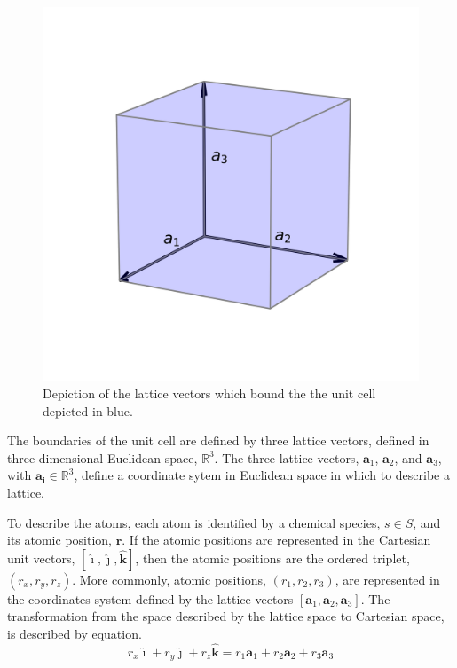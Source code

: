 \begin{figure}[ht]
	\centering
  \includegraphics{chapter3/unit_cell}
  \caption{Depiction of the lattice vectors which bound the the unit cell depicted in blue.}
  \label{fig:unit_cell}
\end{figure}

The boundaries of the unit cell are defined by three lattice vectors, defined in three dimensional Euclidean space, $\mathbb{R}^3$.
The three lattice vectors, $\bm{a}_1$, $\bm{a}_2$, and $\bm{a}_3$, with $\bm{a_i}\in\mathbb{R}^3$, define a coordinate sytem in Euclidean space in which to describe a lattice.

To describe the atoms, each atom is identified by a chemical species, $s\in S$, and its atomic position, $\bm{r}$.
If the atomic positions are represented in the Cartesian unit vectors, $[\hat{\bm{\imath}},\hat{\bm{\jmath}},\hat{\bm{k}}]$, then the atomic positions are the ordered triplet, $(r_x,r_y,r_z)$.
More commonly, atomic positions, $(r_1,r_2,r_3)$, are represented in the coordinates system defined by the lattice vectors $[\bm{a}_1,\bm{a}_2,\bm{a}_3]$.  The transformation from the space described by the lattice space to Cartesian space, is described by equation.
\begin{equation}
	\label{eq:fractional_vs_cartesian_coordinates}
	r_x \hat{\bm{\imath}} + r_y \hat{\bm{\jmath}} + r_z \hat{\bm{k}}
	=
	r_1 \bm{a}_1 + r_2 \bm{a}_2 + r_3 \bm{a}_3
\end{equation}

